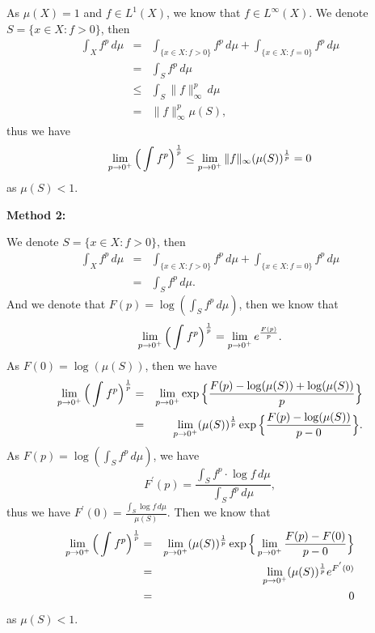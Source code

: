 \documentclass[12pt,a4paper]{ctexart}
\begin{document}
As $\mu(X) = 1$ and $f \in L^{1}(X)$, we know that $f \in L^{\infty} (X)$. We denote $S = \{x \in X: f > 0\}$, then
\begin{eqnarray*}
    \int_{X}^{} f^{p} \, d \mu & = & \int_{\{x \in X: f > 0\}}^{} f^{p} \, d \mu + \int_{\{x \in X: f = 0\}}^{} f^{p} \, d \mu \\
    & = & \int_{S}^{} f^{p} \, d \mu \\
    & \leq & \int_{S}^{} \|f\|_{\infty}^{p} \, d \mu \\
    & = & \|f\|_{\infty}^{p} \mu(S),
\end{eqnarray*}
thus we have
\begin{equation*}
    \lim_{p \to 0^{+}} \Big{(} \int_{}^{} f^{p} \Big{)}^{\frac{1}{p}} \leq \lim_{p \to 0^{+}} \|f\|_{\infty} (\mu(S))^{\frac{1}{p}} = 0
\end{equation*}
as $\mu(S) < 1$. 

\textbf{Method 2:}

We denote $S = \{x \in X: f > 0\}$, then
\begin{eqnarray*}
    \int_{X}^{} f^{p} \, d \mu & = & \int_{\{x \in X: f > 0\}}^{} f^{p} \, d \mu + \int_{\{x \in X: f = 0\}}^{} f^{p} \, d \mu \\
    & = & \int_{S}^{} f^{p} \, d \mu.
\end{eqnarray*}
And we denote that $F(p) = \log (\int_{S}^{} f^{p} \, d \mu)$, then we know that
\begin{equation*}
    \lim_{p \to 0^{+}} \Big{(} \int_{}^{} f^{p} \Big{)}^{\frac{1}{p}} = \lim_{p \to 0^{+}} e^{\frac{F(p)}{p}}.
\end{equation*}
As $F(0) = \log(\mu(S))$, then we have
\begin{eqnarray*}
    \lim_{p \to 0^{+}} \Big{(} \int_{}^{} f^{p} \Big{)}^{\frac{1}{p}} & = & \lim_{p \to 0^{+}} \exp \Big{\{} \frac{F(p) - \log(\mu(S)) + \log(\mu(S))}{p} \Big{\}} \\
    & = & \lim_{p \to 0^{+}} (\mu(S))^{\frac{1}{p}} \exp \Big{\{} \frac{F(p) - \log(\mu(S))}{p - 0} \Big{\}}.
\end{eqnarray*}
As $F(p) = \log (\int_{S}^{} f^{p} \, d \mu)$, we have 
\begin{equation*}
    F^{'}(p) = \frac{\int_{S}^{} f^{p} \cdot \log f \, d \mu}{\int_{S}^{} f^{p} \, d \mu},
\end{equation*}
thus we have $F^{'}(0) = \frac{\int_{S}^{} \log f \, d \mu}{\mu(S)}$. Then we know that
\begin{eqnarray*}
    \lim_{p \to 0^{+}} \Big{(} \int_{}^{} f^{p} \Big{)}^{\frac{1}{p}} & = & \lim_{p \to 0^{+}} (\mu(S))^{\frac{1}{p}} \exp \Big{\{} \lim_{p \to 0^{+}} \frac{F(p) - F(0)}{p - 0} \Big{\}} \\
    & = & \lim_{p \to 0^{+}} (\mu(S))^{\frac{1}{p}} e^{F^{'}(0)} \\
    & = & 0
\end{eqnarray*}
as $\mu(S) < 1$.
\end{document}
